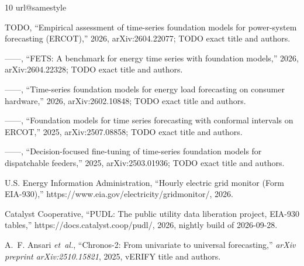\documentclass[conference]{IEEEtran}
\begin{document}
\begin{thebibliography}{10}
\providecommand{\url}[1]{#1}
\csname url@samestyle\endcsname
\providecommand{\newblock}{\relax}
\providecommand{\bibinfo}[2]{#2}
\providecommand{\BIBentrySTDinterwordspacing}{\spaceskip=0pt\relax}
\providecommand{\BIBentryALTinterwordstretchfactor}{4}
\providecommand{\BIBentryALTinterwordspacing}{\spaceskip=\fontdimen2\font plus
\BIBentryALTinterwordstretchfactor\fontdimen3\font minus
  \fontdimen4\font\relax}
\providecommand{\BIBforeignlanguage}[2]{{%
\expandafter\ifx\csname l@#1\endcsname\relax
\typeout{** WARNING: IEEEtran.bst: No hyphenation pattern has been}%
\typeout{** loaded for the language `#1'. Using the pattern for}%
\typeout{** the default language instead.}%
\else
\language=\csname l@#1\endcsname
\fi
#2}}
\providecommand{\BIBdecl}{\relax}
\BIBdecl

{TODO}, ``Empirical assessment of time-series foundation models for
  power-system forecasting ({ERCOT}),'' 2026, arXiv:2604.22077; TODO exact
  title and authors.

------, ``{FETS}: A benchmark for energy time series with foundation models,''
  2026, arXiv:2604.22328; TODO exact title and authors.

------, ``Time-series foundation models for energy load forecasting on consumer
  hardware,'' 2026, arXiv:2602.10848; TODO exact title and authors.

------, ``Foundation models for time series forecasting with conformal
  intervals on {ERCOT},'' 2025, arXiv:2507.08858; TODO exact title and authors.

------, ``Decision-focused fine-tuning of time-series foundation models for
  dispatchable feeders,'' 2025, arXiv:2503.01936; TODO exact title and authors.

{U.S. Energy Information Administration}, ``Hourly electric grid monitor ({Form
  EIA-930}),'' \url{https://www.eia.gov/electricity/gridmonitor/}, 2026.

{Catalyst Cooperative}, ``{PUDL}: The public utility data liberation project,
  {EIA-930} tables,'' \url{https://docs.catalyst.coop/pudl/}, 2026, nightly
  build of 2026-09-28.

A.~F. Ansari \emph{et~al.}, ``{Chronos-2}: From univariate to universal
  forecasting,'' \emph{arXiv preprint arXiv:2510.15821}, 2025, vERIFY title and
  authors.


\end{thebibliography}
\end{document}
